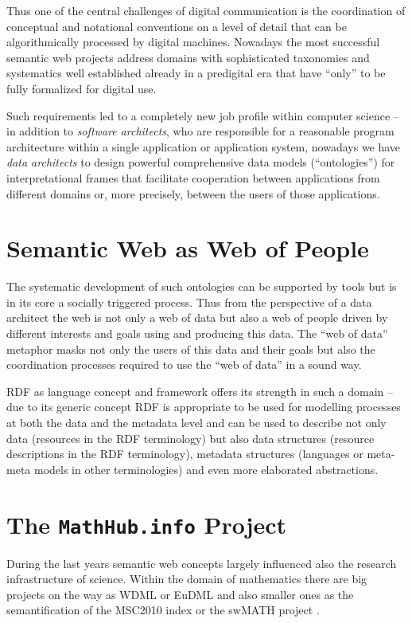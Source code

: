 \documentclass{llncs}
\begin{document}
Thus one of the central challenges of digital communication is the
coordination of conceptual and notational conventions on a level of detail
that can be algorithmically processed by digital machines.  Nowadays the most
successful semantic web projects address domains with sophisticated taxonomies
and systematics well established already in a predigital era that have
``only'' to be fully formalized for digital use.

Such requirements led to a completely new job profile within computer science
-- in addition to \emph{software architects}, who are responsible for a
reasonable program architecture within a single application or application
system, nowadays we have \emph{data architects} to design powerful
comprehensive data models (``ontologies'') for interpretational frames that
facilitate cooperation between applications from different domains or, more
precisely, between the users of those applications.

\section{Semantic Web as Web of People}

The systematic development of such ontologies can be supported by tools but is
in its core a socially triggered process.  Thus from the perspective of a data
architect the web is not only a web of data but also a web of people driven by
different interests and goals using and producing this data. The ``web of
data'' metaphor masks not only the users of this data and their goals but also
the coordination processes required to use the ``web of data'' in a sound way.

RDF as language concept and framework offers its strength in such a domain --
due to its generic concept RDF is appropriate to be used for modelling
processes at both the data and the metadata level and can be used to describe
not only data (resources in the RDF terminology) but also data structures
(resource descriptions in the RDF terminology), metadata structures (languages
or meta-meta models in other terminologies) and even more elaborated
abstractions.  

\section{The \texttt{MathHub.info} Project}

During the last years semantic web concepts largely influenced also the
research infrastructure of science.  Within the domain of mathematics there
are big projects on the way as WDML \cite{PitmannLynch,WDML} or EuDML
\cite{EuDML} and also smaller ones as the semantification of the MSC2010 index
\cite{MSC2010} or the swMATH project \cite{swmath}.
\end{document}
